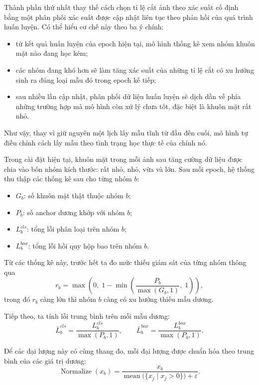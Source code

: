Thành phần thứ nhất thay thế cách chọn tỉ lệ cắt ảnh theo xác suất cố định bằng một phân phối xác suất được cập nhật liên tục theo phản hồi của quá trình huấn luyện.
Có thể hiểu cơ chế này theo ba ý chính:
\begin{itemize}
  \item từ kết quả huấn luyện của epoch hiện tại, mô hình thống kê xem nhóm khuôn mặt nào đang học kém;
  \item các nhóm đang khó hơn sẽ làm tăng xác suất của những tỉ lệ cắt có xu hướng sinh ra đúng loại mẫu đó trong epoch kế tiếp;
  \item sau nhiều lần cập nhật, phân phối dữ liệu huấn luyện sẽ dịch dần về phía những trường hợp mà mô hình còn xử lý chưa tốt, đặc biệt là khuôn mặt rất nhỏ.
\end{itemize}

Như vậy, thay vì giữ nguyên một lịch lấy mẫu tĩnh từ đầu đến cuối, mô hình tự điều chỉnh cách lấy mẫu theo tình trạng học thực tế của chính nó.

Trong cài đặt hiện tại, khuôn mặt trong mỗi ảnh sau tăng cường dữ liệu được chia vào bốn nhóm kích thước: rất nhỏ, nhỏ, vừa và lớn.
Sau mỗi epoch, hệ thống thu thập các thống kê sau cho từng nhóm \(b\):
\begin{itemize}
  \item \(G_b\): số khuôn mặt thật thuộc nhóm \(b\);
  \item \(P_b\): số anchor dương khớp với nhóm \(b\);
  \item \(L^{cls}_b\): tổng lỗi phân loại trên nhóm \(b\);
  \item \(L^{box}_b\): tổng lỗi hồi quy hộp bao trên nhóm \(b\).
\end{itemize}

Từ các thống kê này, trước hết ta đo mức thiếu giám sát của từng nhóm thông qua
\begin{equation}
r_b = \max\!\left(0,\; 1 - \min\!\left(\frac{P_b}{\max(G_b,1)},\; 1\right)\right),
\end{equation}
trong đó \(r_b\) càng lớn thì nhóm \(b\) càng có xu hướng thiếu mẫu dương.

Tiếp theo, ta tính lỗi trung bình trên mỗi mẫu dương:
\begin{equation}
\bar{L}^{cls}_b = \frac{L^{cls}_b}{\max(P_b,1)}, \qquad
\bar{L}^{box}_b = \frac{L^{box}_b}{\max(P_b,1)}.
\end{equation}

Để các đại lượng này có cùng thang đo, mỗi đại lượng được chuẩn hóa theo trung bình của các giá trị dương:
\begin{equation}
\operatorname{Normalize}(x_b) =
\frac{x_b}{\operatorname{mean}\!\bigl(\{x_j \mid x_j > 0\}\bigr) + \varepsilon}.
\end{equation}

